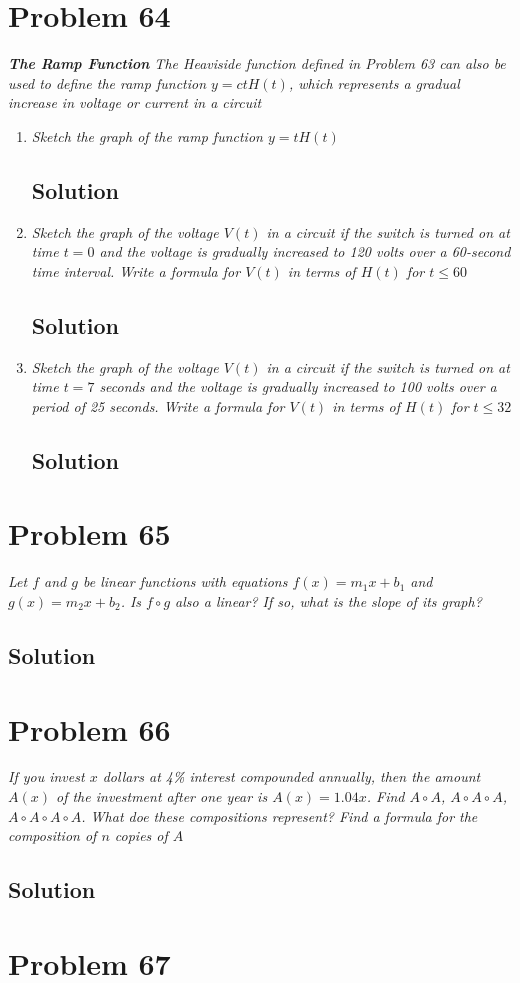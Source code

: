 \documentclass[11pt]{article}
\newcommand{\soln}{\subsection*}
\newcommand{\qn}{\textit}
\begin{document}
\section*{Problem 64}

\qn{\textbf{The Ramp Function} The Heaviside function defined in Problem 63 can also be used to define the ramp function $y=ctH(t)$, which represents a gradual increase in voltage or current in a circuit}

\begin{enumerate}
	\item \qn{Sketch the graph of the ramp function $y=tH(t)$}
	\soln{Solution}
	
	\item \qn{Sketch the graph of the voltage $V(t)$ in a circuit if the switch is turned on at time $t=0$ and the voltage is gradually increased to 120 volts over a 60-second time interval. Write a formula for $V(t)$ in terms of $H(t)$ for $t \le 60$}
	\soln{Solution}
	
	\item \qn{Sketch the graph of the voltage $V(t)$ in a circuit if the switch is turned on at time $t=7$ seconds and the voltage is gradually increased to 100 volts over a period of 25 seconds. Write a formula for $V(t)$ in terms of $H(t)$ for $t \le 32$}
	\soln{Solution}
\end{enumerate}

\section*{Problem 65}

\qn{Let $f$ and $g$ be linear functions with equations $f(x)=m_1x+b_1$ and $g(x)=m_2x+b_2$. Is $f \circ g$ also a linear? If so, what is the slope of its graph?}

\soln{Solution}

\section*{Problem 66}

\qn{If you invest $x$ dollars at 4\% interest compounded annually, then the amount $A(x)$ of the investment after one year is $A(x)=1.04x$. Find $A \circ A$, $A \circ A \circ A$, $A \circ A \circ A \circ A$. What doe these compositions represent? Find a formula for the composition of $n$ copies of $A$}

\soln{Solution}

\section*{Problem 67}
\end{document}
